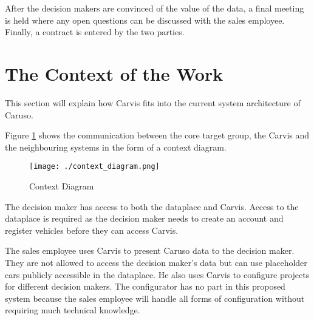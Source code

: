 After the decision makers are convinced of the value of the data, a final meeting is held where any open questions can be discussed with the sales employee. Finally, a contract is entered by the two parties.

\section{The Context of the Work}
This section will explain how Carvis fits into the current system architecture of Caruso.

Figure \ref{ScopeOfWork:ContextDiagram} shows the communication between the core target group, the Carvis and the neighbouring systems in the form of a context diagram.

\begin{figure}[ht]
  \centering
  \texttt{[image: ./context\_diagram.png]}
  \caption{Context Diagram}
  \label{ScopeOfWork:ContextDiagram}
\end{figure}

The decision maker has access to both the \gls{dataplace} and Carvis. Access to the \gls{dataplace} is required as the decision maker needs to create an account and register vehicles before they can access Carvis.

The sales employee uses Carvis to present Caruso data to the decision maker. They are not allowed to access the decision maker's data but can use placeholder cars publicly accessible in the \gls{dataplace}. He also uses Carvis to configure projects for different decision makers. The configurator has no part in this proposed system because the sales employee will handle all forms of configuration without requiring much technical knowledge.
